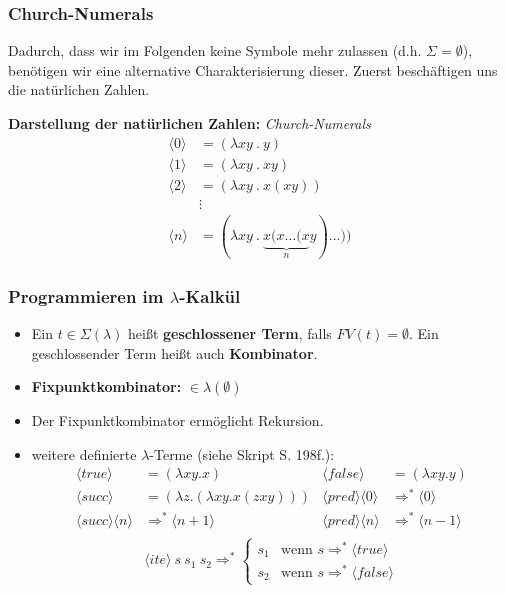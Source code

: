 \documentclass{beamer}
\newcommand{\num}[1]{\ensuremath{\langle #1 \rangle}}
\begin{document}
\begin{frame} \frametitle{Church-Numerals}
	\footnotesize
	
	Dadurch, dass wir im Folgenden keine Symbole mehr zulassen (d.h. $\Sigma = \emptyset$), benötigen wir eine alternative Charakterisierung dieser.
	Zuerst beschäftigen uns die natürlichen Zahlen.
	
	\textbf{Darstellung der natürlichen Zahlen:} \textit{Church-Numerals} 
	\begin{align*}
		\num{0} &= (\lambda xy \ . \ y) \\ 
		\num{1} &= (\lambda xy \ . \ xy) \\
		\num{2} &= (\lambda xy \ . \ x(xy)) \\
		&\vdots \\
		\num{n} &= (\lambda xy \ . \ \underbrace{x (x \dots (x}_n y ) \dots ))
	\end{align*}
\end{frame}


\begin{frame} \frametitle{Programmieren im $\lambda$-Kalkül}
	\footnotesize
	\begin{itemize}
		\item Ein $t \in \Sigma(\lambda)$ heißt \textbf{geschlossener Term}, falls $FV(t) = \emptyset$. Ein geschlossender Term heißt auch \textbf{Kombinator}.
		\item \textbf{Fixpunktkombinator:} \fbox{$\num{Y} = \Bigl( \lambda z . \ \bigl( \lambda u . z (uu) \bigr) \ \bigl( \lambda u. z (uu) \bigr) \Bigr)$} $\in \lambda(\emptyset)$
		\item Der Fixpunktkombinator ermöglicht Rekursion. 
		\pause
		\item weitere definierte $\lambda$-Terme (siehe Skript S. 198f.):
		\begin{align*}
			\num{true} &= (\lambda xy. x) & \num{false} &= (\lambda xy. y) \\
			\num{succ} &= (\lambda z . (\lambda xy . x (zxy))) &  \num{pred}\num{0} &\Rightarrow^\ast \num{0} \\
			\num{succ}\num{n} &\Rightarrow^\ast \num{n+1} & 
			\num{pred}\num{n} &\Rightarrow^\ast \num{n-1} \\
		\end{align*}
		\begin{equation*}
			\num{ite} \ s \ s_1 \ s_2 \Rightarrow^\ast \begin{cases}
			s_1 & \text{wenn } s \Rightarrow^\ast \num{true} \\
			s_2 & \text{wenn } s \Rightarrow^\ast \num{false}
			\end{cases}
		\end{equation*}
	\end{itemize}
\end{frame}
\end{document}
